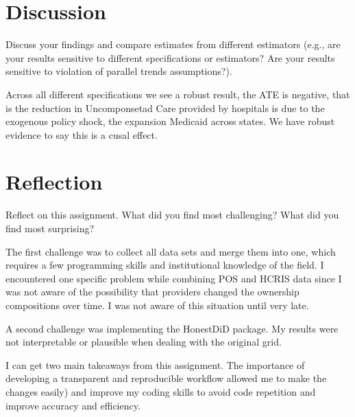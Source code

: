 \documentclass[
  12pt,
]{article}
\begin{document}
\newpage

\hypertarget{discussion}{%
\section{Discussion}\label{discussion}}

Discuss your findings and compare estimates from different estimators
(e.g., are your results sensitive to different specifications or
estimators? Are your results sensitive to violation of parallel trends
assumptions?).

Across all different specifications we see a robust result, the ATE is
negative, that is the reduction in Uncomponsetad Care provided by
hospitals is due to the exogenous policy shock, the expansion Medicaid
across states. We have robust evidence to say this is a cusal effect.

\newpage

\hypertarget{reflection}{%
\section{Reflection}\label{reflection}}

Reflect on this assignment. What did you find most challenging? What did
you find most surprising?

The first challenge was to collect all data sets and merge them into
one, which requires a few programming skills and institutional knowledge
of the field. I encountered one specific problem while combining POS and
HCRIS data since I was not aware of the possibility that providers
changed the ownership compositions over time. I was not aware of this
situation until very late.

A second challenge was implementing the HonestDiD package. My results
were not interpretable or plausible when dealing with the original grid.

I can get two main takeaways from this assignment. The importance of
developing a transparent and reproducible workflow allowed me to make
the changes easily) and improve my coding skills to avoid code
repetition and improve accuracy and efficiency.
\end{document}
